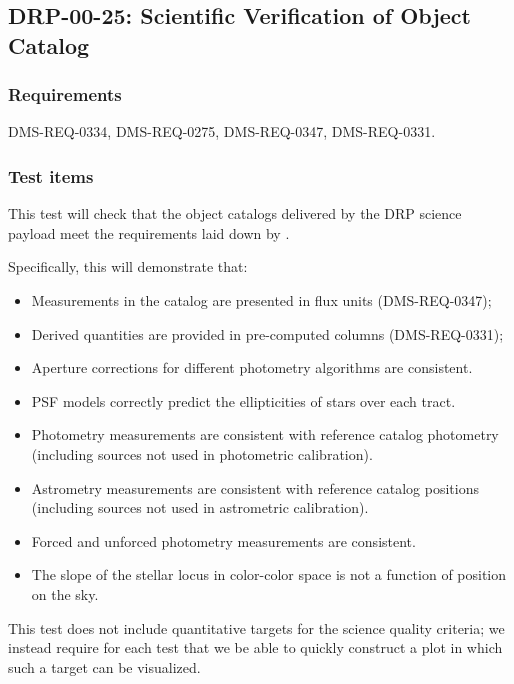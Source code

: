 \subsection{DRP-00-25: Scientific Verification of Object Catalog}
\label{drp-00-25}

\subsubsection{Requirements}

DMS-REQ-0334, DMS-REQ-0275, DMS-REQ-0347, DMS-REQ-0331.

\subsubsection{Test items}
\label{drp-00-25-items}

This test will check that the object catalogs delivered by the DRP science
payload meet the requirements laid down by .

Specifically, this will demonstrate that:

\begin{itemize}

  \item{Measurements in the catalog are presented in flux units
  (DMS-REQ-0347);}
  \item{Derived quantities are provided in pre-computed columns
  (DMS-REQ-0331);}
  \item{Aperture corrections for different photometry algorithms are consistent.}
  \item{PSF models correctly predict the ellipticities of stars over each tract.}
  \item{Photometry measurements are consistent with reference catalog photometry (including sources not used in photometric calibration).}
  \item{Astrometry measurements are consistent with reference catalog positions (including sources not used in astrometric calibration).}
  \item{Forced and unforced photometry measurements are consistent.}
  \item{The slope of the stellar locus in color-color space is not a function of position on the sky.}

\end{itemize}

This test does not include quantitative targets for the science quality criteria; we instead require for each test that we be able to quickly construct a plot in which such a target can be visualized.

